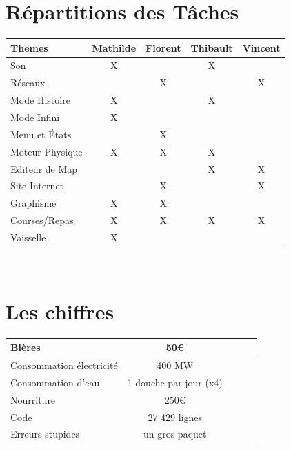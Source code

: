 \documentclass [11pt]{report}
\begin{document}
	
\newpage
	\section{Répartitions des Tâches}
	\vspace{8mm}
	\begin{center}
			\begin{tabular}{| l |*{4} {c|}}
				\hline
				Themes  & Mathilde & Florent & Thibault & Vincent \\
				\hline
				Son     & X &         & X    &        \\
				\hline
				Réseaux       &     & X       &       & X     \\
				\hline
				Mode Histoire     & X &     & X      &       \\
				\hline
				Mode Infini         & X &      &     &          \\
				\hline
				Menu et \'Etats        &  & X    &  &          \\
								\hline
				Moteur Physique & X      & X        & X &           \\
				\hline
				Editeur de Map &     &       & X     &  X\\
				\hline
				Site Internet  &    & X &     &  X       \\
				\hline
				Graphisme      & X  &  X  &         &\\
				\hline
				Courses/Repas      & X  &  X  &  X  & X\\
				\hline
				Vaisselle      & X  &     &         &\\
				\hline
				
			\end{tabular}\\\vspace{3mm}
	\end{center}
	
	\vspace{10mm}
	
	\section{Les chiffres}
	\vspace{8mm}
		\begin{center}
				\begin{tabular}{| l |*{4} {c|}}
				\hline
				Bières & 50€ \\
				\hline
				Consommation électricité & 400 MW  \\
				\hline
				Consommation d'eau & 1 douche par jour (x4)  \\
				\hline
				Nourriture & 250€ \\
				\hline
				Code & 27 429 lignes  \\
				\hline
				Erreurs stupides & un gros paquet  \\
				\hline
					
				\end{tabular}\\\vspace{3mm}
		\end{center}
	
\end{document}
